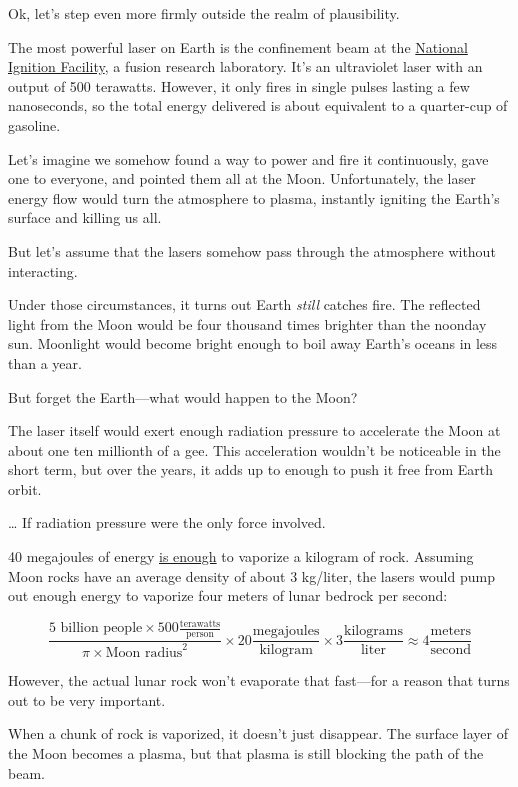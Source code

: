 {Ok, let’s step even more firmly outside the realm of plausibility.}

{The most powerful laser on Earth is the confinement beam at the \href{http://en.wikipedia.org/wiki/National\_Ignition\_Facility}{National Ignition Facility}, a fusion research laboratory. It’s an ultraviolet laser with an output of 500 terawatts. However, it only fires in single pulses lasting a few nanoseconds, so the total energy delivered is about equivalent to a quarter-cup of gasoline.}

{Let’s imagine we somehow found a way to power and fire it continuously, gave one to everyone, and pointed them all at the Moon. Unfortunately, the laser energy flow would turn the atmosphere to plasma, instantly igniting the Earth’s surface and killing us all.}

{But let’s assume that the lasers somehow pass through the atmosphere without interacting.}

{Under those circumstances, it turns out Earth \emph{still} catches fire. The reflected light from the Moon would be four thousand times brighter than the noonday sun. Moonlight would become bright enough to boil away Earth’s oceans in less than a year.}

{But forget the Earth—what would happen to the Moon?}

{The laser itself would exert enough radiation pressure to accelerate the Moon at about one ten millionth of a gee. This acceleration wouldn’t be noticeable in the short term, but over the years, it adds up to enough to push it free from Earth orbit.}

{… If radiation pressure were the only force involved.}

{40 megajoules of energy \href{http://www.psfc.mit.edu/library1/catalog/reports/2000/09rr/09rr011/09rr011\_full.pdf}{is enough} to vaporize a kilogram of rock. Assuming Moon rocks have an average density of about 3 kg/liter, the lasers would pump out enough energy to vaporize four meters of lunar bedrock per second:}

{\[\frac{5\text{ billion people}\times 500\frac{\mathrm{terawatts}}{\text{person}}}{\pi\times\text{Moon radius}^2}\times20\frac{\mathrm{megajoules}}{\mathrm{kilogram}}\times 3\frac{\mathrm{kilograms}}{\mathrm{liter}}\approx4
\frac{\mathrm{meters}}{\text{second}}\]}

{However, the actual lunar rock won’t evaporate that fast—for a reason that turns out to be very important.}

{When a chunk of rock is vaporized, it doesn’t just disappear. The surface layer of the Moon becomes a plasma, but that plasma is still blocking the path of the beam.}

